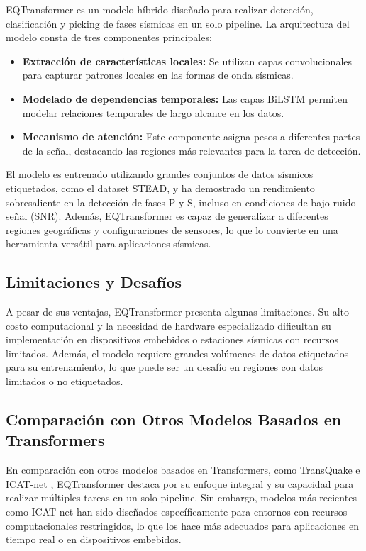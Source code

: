 EQTransformer es un modelo híbrido diseñado para realizar detección, clasificación y picking de fases sísmicas en un solo pipeline. La arquitectura del modelo consta de tres componentes principales:

\begin{itemize}
    \item \textbf{Extracción de características locales:} Se utilizan capas convolucionales para capturar patrones locales en las formas de onda sísmicas.
    \item \textbf{Modelado de dependencias temporales:} Las capas BiLSTM permiten modelar relaciones temporales de largo alcance en los datos.
    \item \textbf{Mecanismo de atención:} Este componente asigna pesos a diferentes partes de la señal, destacando las regiones más relevantes para la tarea de detección.
\end{itemize}

El modelo es entrenado utilizando grandes conjuntos de datos sísmicos etiquetados, como el dataset STEAD, y ha demostrado un rendimiento sobresaliente en la detección de fases P y S, incluso en condiciones de bajo ruido-señal (SNR). Además, EQTransformer es capaz de generalizar a diferentes regiones geográficas y configuraciones de sensores, lo que lo convierte en una herramienta versátil para aplicaciones sísmicas.

\subsection{Limitaciones y Desafíos}

A pesar de sus ventajas, EQTransformer presenta algunas limitaciones. Su alto costo computacional y la necesidad de hardware especializado dificultan su implementación en dispositivos embebidos o estaciones sísmicas con recursos limitados. Además, el modelo requiere grandes volúmenes de datos etiquetados para su entrenamiento, lo que puede ser un desafío en regiones con datos limitados o no etiquetados.

\subsection{Comparación con Otros Modelos Basados en Transformers}

En comparación con otros modelos basados en Transformers, como TransQuake \cite{zhang2023ept} e ICAT-net \cite{Bertino93}, EQTransformer destaca por su enfoque integral y su capacidad para realizar múltiples tareas en un solo pipeline. Sin embargo, modelos más recientes como ICAT-net han sido diseñados específicamente para entornos con recursos computacionales restringidos, lo que los hace más adecuados para aplicaciones en tiempo real o en dispositivos embebidos.


